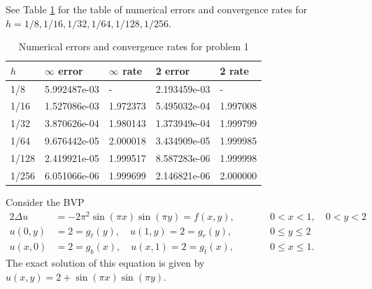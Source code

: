 \documentclass{homework}
\begin{document}
\begin{alphaparts}
		\questionpart See Table \ref{table:p1d} for the table of numerical errors and convergence rates for $h = 1/8, 1/16, 1/32, 1/64, 1/128, 1/256$.
		
		\begin{table}[h]
			\centering
			\begin{tabular}{@{}lllll@{}}
				\toprule
				$h$ & $\infty$ error & $\infty$ rate & 2 error & 2 rate \\
				\midrule
				1/8  &	5.992487e-03 &	- &       	2.193459e-03 &	-\\        
				1/16 & 	1.527086e-03 &	1.972373 &	5.495032e-04 &	1.997008 \\
				1/32 & 	3.870626e-04 &	1.980143 &	1.373949e-04 &	1.999799 \\
				1/64  &	9.676442e-05 &	2.000018 &	3.434909e-05 &	1.999985 \\
				1/128  &	2.419921e-05 &	1.999517 &	8.587283e-06 &	1.999998 \\
				1/256  &	6.051066e-06 &	1.999699 &	2.146821e-06 &	2.000000 \\
				\bottomrule
			\end{tabular}
			\caption{Numerical errors and convergence rates for problem 1}
			\label{table:p1d}
		\end{table}
	\end{alphaparts}
	
	\question
	Consider the BVP
	\begin{alignat*}{2}
		\Delta u &= -2\pi^2\sin(\pi x)\sin(\pi y) = f(x,y), &\qquad &0<x<1, \quad 0<y<2 \\
		u(0,y) &= 2 = g_\ell(y), \quad u(1, y) = 2 = g_r(y), & \qquad &0 \le y \le 2\\
		u(x,0) &= 2 = g_b(x), \quad u(x, 1) = 2 = g_t(x), & \qquad &0 \le x \le 1. 
	\end{alignat*}
	The exact solution of this equation is given by $u(x,y) = 2 +\sin(\pi x)\sin(\pi y)$.
	
\end{document}
